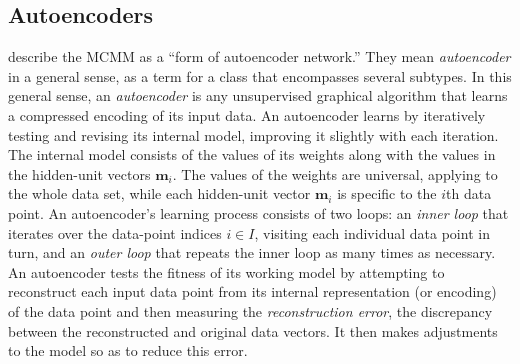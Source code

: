 \subsection{Autoencoders}
\label{sec:autoencoders}
\citet[][p. 2]{dayan-and-zemel:95} describe the MCMM as a ``form of autoencoder network.'' 
They mean \emph{autoencoder} in a general sense, as a term for a class that encompasses several subtypes.  
In this general sense, an \emph{autoencoder} is any unsupervised graphical algorithm that
learns a compressed encoding of its input data. 
An autoencoder learns by iteratively testing and revising its internal model, improving it slightly with each iteration. 
The internal model consists of the values of its weights along with 
the values in the hidden-unit vectors $\textbf{m}_i$. The values 
of the weights are universal, applying to the whole data set, while 
each hidden-unit vector $\textbf{m}_i$ is specific to the $i$th data point. 
An autoencoder's learning process consists of two
loops: an \emph{inner loop} that iterates over the data-point indices $i \in I$, 
visiting each individual data point in turn, and an \emph{outer loop} that repeats 
the inner loop as many times as necessary.
An autoencoder tests the fitness of its working model by attempting to reconstruct each input data 
point from its internal representation (or encoding) of the data point 
and then measuring the \emph{reconstruction error}, the discrepancy between the reconstructed and original data vectors.  
It then makes adjustments to the model so as to reduce this error. %
